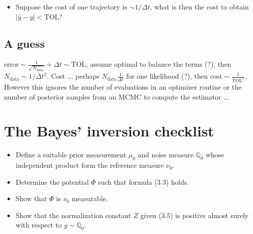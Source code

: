 \documentclass{amsart}
\numberwithin{equation}{section}
\numberwithin{table}{section}
\numberwithin{figure}{section}
\theoremstyle{plain}
\theoremstyle{definition}
\theoremstyle{remark}
\begin{document}
\begin{itemize}
\item Suppose the cost of one trajectory is $\sim 1/\Delta t$, what is
  then the cost to obtain $|\hat{y}-y| < \text{TOL}$?
\end{itemize}

\subsection{A guess}
$\text{error} \sim \frac{1}{\sqrt{N_{\text{data}}}} + \Delta t \sim \text{TOL}$,
  assume optimal to balance the terms (?), then
  $N_\text{data} \sim 1/\Delta t^2$. Cost $\dots$ perhaps
  $N_{\text{data}} \frac{1}{\Delta t}$ for one likelihood (?), then
  $\text{cost} \sim \frac{1}{\text{TOL}^3}$. However this ignores the
number of evaluations in an optimizer routine or the number of
posterior samples from an MCMC to compute the estimator $\dots$

\section{The Bayes' inversion checklist}
\begin{itemize}
\item Define a suitable prior measurement $\mu_0$ and noise measure
  $\mathbb{Q}_0$ whose independent product form the reference measure $\nu_0$.
\item Determine the potential $\Phi$ such that formula (3.3) holds.
\item Show that $\Phi$ is $\nu_0$ measurable.
\item Show that the normalization constant $Z$ given (3.5) is positive
  almost surely with respect to $y \sim \mathbb{Q}_0$.
\end{itemize}
\end{document}
